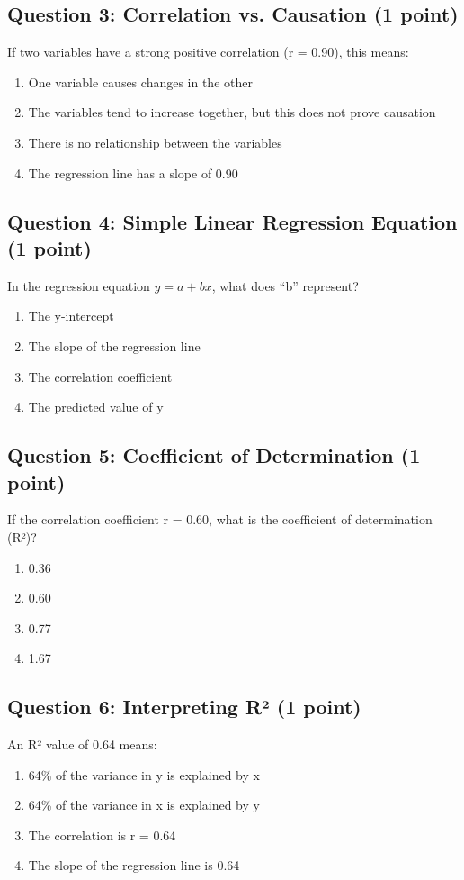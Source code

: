 \documentclass[10pt]{article}
\begin{document}
\subsection*{Question 3: Correlation vs. Causation (1 point)}
If two variables have a strong positive correlation (r = 0.90), this means:
\begin{enumerate}[label=\Alph*., leftmargin=20pt]
\item One variable causes changes in the other
\item The variables tend to increase together, but this does not prove causation
\item There is no relationship between the variables
\item The regression line has a slope of 0.90
\end{enumerate}

\subsection*{Question 4: Simple Linear Regression Equation (1 point)}
In the regression equation $\hat{y} = a + bx$, what does ``b'' represent?
\begin{enumerate}[label=\Alph*., leftmargin=20pt]
\item The y-intercept
\item The slope of the regression line
\item The correlation coefficient
\item The predicted value of y
\end{enumerate}

\subsection*{Question 5: Coefficient of Determination (1 point)}
If the correlation coefficient r = 0.60, what is the coefficient of determination (R²)?
\begin{enumerate}[label=\Alph*., leftmargin=20pt]
\item 0.36
\item 0.60
\item 0.77
\item 1.67
\end{enumerate}

\subsection*{Question 6: Interpreting R² (1 point)}
An R² value of 0.64 means:
\begin{enumerate}[label=\Alph*., leftmargin=20pt]
\item 64\% of the variance in y is explained by x
\item 64\% of the variance in x is explained by y
\item The correlation is r = 0.64
\item The slope of the regression line is 0.64
\end{enumerate}
\end{document}
